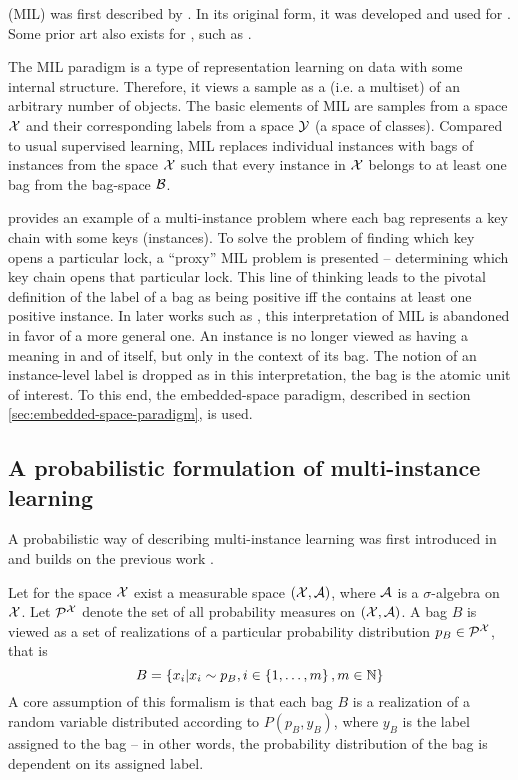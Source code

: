  (MIL) was first described by \cite{dietterich_solving_1997}. In its original form, it was developed and used for . Some prior art also exists for , such as \cite{chen_contextual_2012}.

The MIL paradigm is a type of representation learning on data with some internal structure. Therefore, it views a sample as a  (i.e. a multiset) of an arbitrary number of objects. The basic elements of MIL are samples from a space \( \mathcal{X} \) and their corresponding labels from a space \( \mathcal{Y} \) (a space of classes). Compared to usual supervised learning, MIL replaces individual instances with bags of instances from the space \( \mathcal{X} \) such that every instance in \( \mathcal{X} \) belongs to at least one bag from the bag-space \( \mathcal{B} \).

\cite{dietterich_solving_1997} provides an example of a multi-instance problem where each bag represents a key chain with some keys (instances). To solve the problem of finding which key opens a particular lock, a \enquote{proxy} MIL problem is presented -- determining which key chain opens that particular lock. This line of thinking leads to the pivotal definition of the label of a bag as being positive iff the contains at least one positive instance. In later works such as \cite{pevny_using_2017}, this interpretation of MIL is abandoned in favor of a more general one. An instance is no longer viewed as having a meaning in and of itself, but only in the context of its bag. The notion of an instance-level label is dropped as in this interpretation, the bag is the atomic unit of interest. To this end, the embedded-space paradigm, described in section \ref{sec:embedded-space-paradigm}, is used.

\subsection{A probabilistic formulation of multi-instance learning}\label{sec:probabilistic-formalism}
A probabilistic way of describing multi-instance learning was first introduced in \cite{pevny_using_2017} and builds on the previous work \cite{muandet_learning_2012}.

Let for the space \( \mathcal{X} \) exist a measurable space \( \left( \mathcal{X}, \mathcal{A} \right) \), where \( \mathcal{A} \) is a \( \sigma \)-algebra on \( \mathcal{X} \). Let \( \mathcal{P}^\mathspace{X} \) denote the set of all probability measures on \( \left( \mathcal{X}, \mathcal{A} \right) \). A bag \( B \) is viewed as a set of realizations of a particular probability distribution \( p_B \in \mathcal{P}^\mathspace{X} \), that is
\[ B = \left\{ x_i \middle| x_i \sim p_B, i \in \left\{ 1, \dots, m \right\}, m \in \mathbb{N} \right\} \]
A core assumption of this formalism is that each bag \( B \) is a realization of a random variable distributed according to \( P \left( p_B, y_B \right) \), where \( y_B \) is the label assigned to the bag -- in other words, the probability distribution of the bag is dependent on its assigned label.

